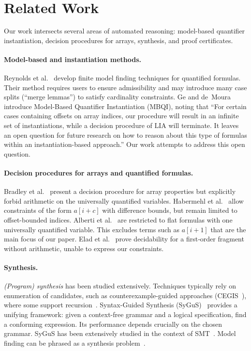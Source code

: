 \documentclass[runningheads]{llncs}
\newcommand{\sygus}{SyGuS\xspace}
\begin{document}
\section{Related Work}

Our work intersects several areas of automated reasoning: model-based quantifier instantiation, decision
procedures for arrays, synthesis, and proof certificates.

\paragraph{Model-based and instantiation methods.}
Reynolds et al.~\cite{reynolds2016model,reynolds2013finite} develop finite model finding techniques for quantified formulas. Their method requires users to ensure admissibility and may introduce many case splits (``merge lemmas'') to satisfy cardinality constraints. Ge and de Moura~\cite{ge-cav09} introduce Model-Based Quantifier Instantiation (MBQI), noting that ``For certain cases containing offsets on array indices, our procedure will result in an infinite set of instantiations, while a decision procedure of LIA
will terminate. It leaves an open question for future research on how to reason about this type of formulas within an instantiation-based approach.'' Our work attempts to  address this open question.

\paragraph{Decision procedures for arrays and quantified formulas.}
Bradley et al.~\cite{bradley-vmcai06} present a decision procedure for array properties but explicitly forbid arithmetic on the universally quantified variables. Habermehl et al.~\cite{habermehl-etaps08} allow constraints of the form $a[i+c]$ with difference bounds, but remain limited to offset-bounded indices. Alberti et al.~\cite{alberti2014decision} are restricted to flat formulas with one universally quantified variable. This excludes terms such as $a[i+1]$ that are the main focus of our paper. Elad et al.~\cite{elad2024infinite} prove decidability for a first‑order fragment without arithmetic, unable to express our constraints.

\paragraph{Synthesis.}
\emph{(Program) synthesis} has been studied extensively. Techniques typically rely on
enumeration of candidates, such as counterexample-guided approaches
(CEGIS~\cite{cegis}), where some support recursion~\cite{Farzan2021,Kneuss2013}.
Syntax-Guided Synthesis (\sygus)~\cite{sygus} provides a unifying framework:
given a context-free grammar and a logical specification, find a conforming
expression. Its performance depends crucially on the chosen grammar. \sygus has
been extensively studied in the context of
SMT~\cite{reynolds-fmsd19,abate-jar23,ReynoldsBLT20}.
Model finding can be phrased as a synthesis problem~\cite{ParsertBJK23}.
\end{document}
